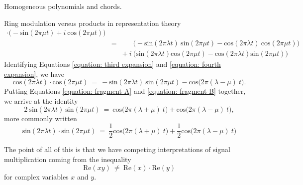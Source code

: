 \documentclass[letterpaper,11pt, reqno]{amsart}
\newtheorem{monodromy theorem}{Monodromy Theorem}[subsection]
\newtheorem{wild conjecture}[theorem]{Wild Conjecture}
\newtheorem{research objectives}{Research objectives}[subsection]
\newtheorem{research question}[theorem]{Research questions}
\newtheorem{aside question}[theorem]{Aside question}
\newtheorem{audio example}[theorem]{\loudspeaker[3] Example}
\newtheorem{blank remark}[theorem]{}
\newtheorem{terminology and comment}[theorem]{Terminology and comment}
\newtheorem{purity hypothesis}[theorem]{Purity hypothesis}
\newtheorem{corollary of the purity hypothesis}[theorem]{Corollary of the purity hypothesis}
\numberwithin{equation}{theorem}
\begin{document}
\begin{section}{Homogeneous polynomials and chords.}
\begin{subsection}{Ring modulation versus products in representation theory}
\begin{equation}
\begin{array}{rcl}
	\cdot
	\big(-\text{sin}(2\pi\mu t)+i\ \text{cos}(2\pi\mu t)\big)
	\\[6pt]
	& \!\!=\!\!
	& \ \ \ \ \ \ \ \!\big(
	-\text{sin}(2\pi\lambda t)\ \!\text{sin}(2\pi\mu t)
	-
	\text{cos}(2\pi\lambda t)\ \!\text{cos}(2\pi\mu t)
	\big)
	\\[6pt]
	&
	& 
	+\ i\ 
	\big(\text{sin}(2\pi\lambda t)\text{cos}(2\pi\mu t)-\text{cos}(2\pi\lambda t)\text{sin}(2\pi\mu t)\big)
	\end{array}
	\end{equation}
Identifying Equations \eqref{equation: third expansion} and \eqref{equation: fourth expansion}, we have
	\begin{equation}\label{equation: fragment B}
	\text{cos}(2\pi\lambda t)\cdot\text{cos}(2\pi\mu t)
	\ =\ 
	-\text{sin}(2\pi\lambda t)\ \!\text{sin}(2\pi\mu t)
	-
	\text{cos}\big(2\pi(\lambda-\mu)\ \!t\big).
	\end{equation}
Putting Equations \eqref{equation: fragment A} and \eqref{equation: fragment B} together, we arrive at the identity
	$$
	2\ \text{sin}(2\pi\lambda t)\ \!\text{sin}(2\pi\mu t)
	\ =\ 
	\text{cos}\big(2\pi(\lambda+\mu)\ \!t\big)+\text{cos}\big(2\pi(\lambda-\mu)\ \!t\big),
	$$
more commonly written
	\begin{equation}\label{equation: trig identity}
	\text{sin}(2\pi\lambda t)\cdot\text{sin}(2\pi\mu t)
	\ =\ 
	\frac{1}{2}\text{cos}\big(2\pi(\lambda+\mu)\ \!t\big)+\frac{1}{2}\text{cos}\big(2\pi(\lambda-\mu)\ \!t\big)
	\end{equation}

	The point of all of this is that we have competing interpretations of signal multiplication coming from the inequality
	$$
	\text{Re}(xy)\ \neq\ \text{Re}(x)\cdot\text{Re}(y)
	$$
for complex variables $x$ and $y$.
	

\end{subsection}
\end{section}
\end{document}
